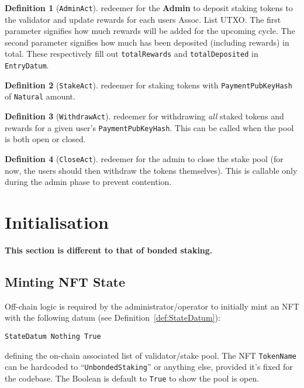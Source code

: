 \documentclass[10pt, a4paper]{article}
\theoremstyle{definition}
\newtheorem{definition}{Definition}[section]
\begin{document}
\begin{definition}[\texttt{AdminAct}]\label{def:AdminAct} redeemer for the \textbf{Admin} to deposit staking tokens to the validator and update rewards for each users Assoc. List UTXO. The first parameter signifies how much rewards will be added for the upcoming cycle. The second parameter signifies how much has been deposited (including rewards) in total. These respectively fill out \texttt{totalRewards} and \texttt{totalDeposited} in \texttt{EntryDatum}.
\end{definition}

\begin{definition}[\texttt{StakeAct}]\label{def:StakeAct} redeemer for staking tokens with \texttt{PaymentPubKeyHash} of \texttt{Natural} amount.
\end{definition}

\begin{definition}[\texttt{WithdrawAct}]\label{def:WithdrawAct} redeemer for withdrawing \textit{all} staked tokens and rewards for a given user's \texttt{PaymentPubKeyHash}. This can be called when the pool is both open or closed.
\end{definition}

\begin{definition}[\texttt{CloseAct}]\label{def:CloseAct} redeemer for the admin to close the stake pool (for now, the users should then withdraw the tokens themselves). This is callable only during the admin phase to prevent contention.
\end{definition}

\section{Initialisation}\label{section:initialisation}
\textbf{This section is different to that of bonded staking.}
\subsection{Minting NFT State}\label{subsection:mintNft}

Off-chain logic is required by the administrator/operator to initially mint an NFT with the following datum (see Definition~\ref{def:StateDatum}):
\begin{verbatim}
StateDatum Nothing True
\end{verbatim}
defining the on-chain associated list of validator/stake pool. The NFT \texttt{TokenName} can be hardcoded to ``\texttt{UnbondedStaking}'' or anything else, provided it's fixed for the codebase. The Boolean is default to \texttt{True} to show the pool is open.
\end{document}
